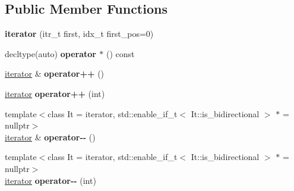 \subsection*{Public Member Functions}
\begin{DoxyCompactItemize}
\item 
\mbox{\label{classouchi_1_1indexed__iterator_1_1iterator_ad8990bcfcdbac47725de38e487f625d8}} 
{\bfseries iterator} (itr\+\_\+t first, idx\+\_\+t first\+\_\+pos=0)
\item 
\mbox{\label{classouchi_1_1indexed__iterator_1_1iterator_a4396b784755d7d6f06bcf098216608af}} 
decltype(auto) {\bfseries operator $\ast$} () const
\item 
\mbox{\label{classouchi_1_1indexed__iterator_1_1iterator_a864565c020689d7ab15233f80e435331}} 
\mbox{\hyperlink{classouchi_1_1indexed__iterator_1_1iterator}{iterator}} \& {\bfseries operator++} ()
\item 
\mbox{\label{classouchi_1_1indexed__iterator_1_1iterator_af166ffbe734a4311f959d65142a40237}} 
\mbox{\hyperlink{classouchi_1_1indexed__iterator_1_1iterator}{iterator}} {\bfseries operator++} (int)
\item 
\mbox{\label{classouchi_1_1indexed__iterator_1_1iterator_a20c3be649528fd7a2f1590f1bc71119e}} 
{\footnotesize template$<$class It  = iterator, std\+::enable\+\_\+if\+\_\+t$<$ It\+::is\+\_\+bidirectional $>$ $\ast$  = nullptr$>$ }\\\mbox{\hyperlink{classouchi_1_1indexed__iterator_1_1iterator}{iterator}} \& {\bfseries operator-\/-\/} ()
\item 
\mbox{\label{classouchi_1_1indexed__iterator_1_1iterator_a2a249037681d0f568a28099fce930673}} 
{\footnotesize template$<$class It  = iterator, std\+::enable\+\_\+if\+\_\+t$<$ It\+::is\+\_\+bidirectional $>$ $\ast$  = nullptr$>$ }\\\mbox{\hyperlink{classouchi_1_1indexed__iterator_1_1iterator}{iterator}} {\bfseries operator-\/-\/} (int)
\end{DoxyCompactItemize}
